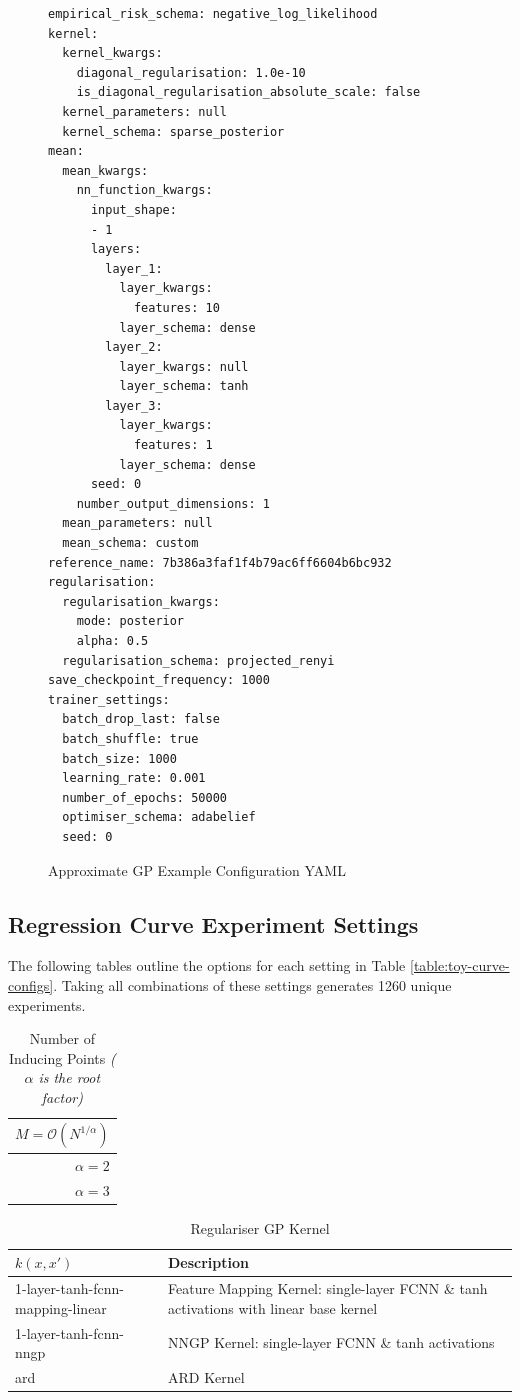 \documentclass{article}
\numberwithin{equation}{section}
\begin{document}
\newpage
\begin{figure}[!h]
\begin{lstlisting}[style=yaml]
empirical_risk_schema: negative_log_likelihood
kernel:
  kernel_kwargs:
    diagonal_regularisation: 1.0e-10
    is_diagonal_regularisation_absolute_scale: false
  kernel_parameters: null
  kernel_schema: sparse_posterior
mean:
  mean_kwargs:
    nn_function_kwargs:
      input_shape:
      - 1
      layers:
        layer_1:
          layer_kwargs:
            features: 10
          layer_schema: dense
        layer_2:
          layer_kwargs: null
          layer_schema: tanh
        layer_3:
          layer_kwargs:
            features: 1
          layer_schema: dense
      seed: 0
    number_output_dimensions: 1
  mean_parameters: null
  mean_schema: custom
reference_name: 7b386a3faf1f4b79ac6ff6604b6bc932
regularisation:
  regularisation_kwargs:
    mode: posterior
    alpha: 0.5
  regularisation_schema: projected_renyi
save_checkpoint_frequency: 1000
trainer_settings:
  batch_drop_last: false
  batch_shuffle: true
  batch_size: 1000
  learning_rate: 0.001
  number_of_epochs: 50000
  optimiser_schema: adabelief
  seed: 0
\end{lstlisting}
\caption{Approximate GP Example Configuration YAML}
\end{figure}
\newpage 
\subsection{Regression Curve Experiment Settings}\label{appendix:configurations}
The following tables outline the options for each setting in Table \ref{table:toy-curve-configs}. 
Taking all combinations of these settings generates 1260 unique experiments.

\begin{table}[h!]
\tiny
\centering
\begin{tabular}{r}
\toprule
 $M = \mathcal{O}\left(N^{1/\alpha}\right)$ \\
\midrule
                                 $\alpha=2$ \\
                                 $\alpha=3$ \\
\bottomrule
\end{tabular}
\caption{Number of Inducing Points \textit{($\alpha$ is the root factor)}}
\end{table}

\begin{table}[h!]
\tiny
\centering
\begin{tabular}{ll}
\toprule
             $k(x, x')$ & Description\\
\midrule
1-layer-tanh-fcnn-mapping-linear & Feature Mapping Kernel: single-layer FCNN \& tanh activations with linear base kernel\\
          1-layer-tanh-fcnn-nngp &  NNGP Kernel: single-layer FCNN \& tanh activations\\
                            ard & ARD Kernel\\
\bottomrule
\end{tabular}
\caption{Regulariser GP Kernel}
\end{table}
\end{document}
